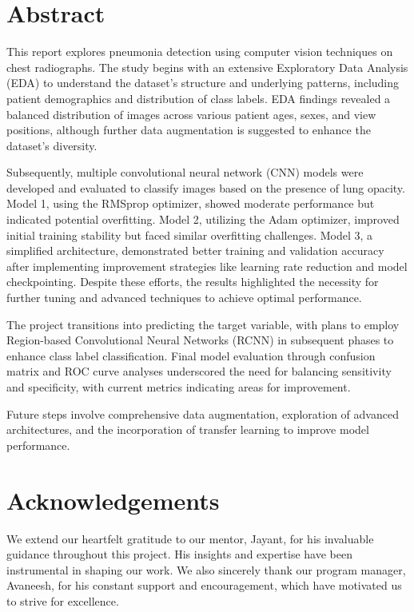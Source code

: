 \documentclass[11pt]{report}
\begin{document}
\maketitle

\chapter*{Abstract}

This report explores pneumonia detection using computer vision techniques on chest radiographs. The study begins with an extensive Exploratory Data Analysis (EDA) to understand the dataset's structure and underlying patterns, including patient demographics and distribution of class labels. EDA findings revealed a balanced distribution of images across various patient ages, sexes, and view positions, although further data augmentation is suggested to enhance the dataset's diversity.

Subsequently, multiple convolutional neural network (CNN) models were developed and evaluated to classify images based on the presence of lung opacity. Model 1, using the RMSprop optimizer, showed moderate performance but indicated potential overfitting. Model 2, utilizing the Adam optimizer, improved initial training stability but faced similar overfitting challenges. Model 3, a simplified architecture, demonstrated better training and validation accuracy after implementing improvement strategies like learning rate reduction and model checkpointing. Despite these efforts, the results highlighted the necessity for further tuning and advanced techniques to achieve optimal performance.

The project transitions into predicting the target variable, with plans to employ Region-based Convolutional Neural Networks (RCNN) in subsequent phases to enhance class label classification. Final model evaluation through confusion matrix and ROC curve analyses underscored the need for balancing sensitivity and specificity, with current metrics indicating areas for improvement.

Future steps involve comprehensive data augmentation, exploration of advanced architectures, and the incorporation of transfer learning to improve model performance.
\vspace{2cm}

\chapter*{Acknowledgements}
We extend our heartfelt gratitude to our mentor, Jayant, for his invaluable guidance throughout this project. His insights and expertise have been instrumental in shaping our work. We also sincerely thank our program manager, Avaneesh, for his constant support and encouragement, which have motivated us to strive for excellence.
\end{document}
